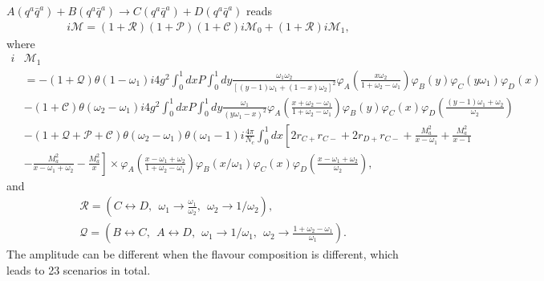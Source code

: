 \documentclass[8pt]{beamer}
\begin{document}
\begin{frame}
	$A(q^a \bar
		q^a)+B(q^a\bar q^a)\rightarrow C(q^a\bar q^a)+D(q^a\bar q^a) $ reads
	\begin{eqnarray}
		i\mathcal{M}
		=(1+\mathcal{R})(1+\mathcal{P})(1+\mathcal{C})i\mathcal{M}_{0}+(1+\mathcal{R})i\mathcal{M}_{1},
	\end{eqnarray}
	where
	\small
	\begin{align*}
		i & \mathcal{M}_{1}                                                    \\
		  & =-(1+\mathcal{Q})\theta(1-\omega_1)i4g^2\int_0^1
		dx P\int_0^1
		dy\frac{\omega_1\omega_2}{[(y-1)\omega_1+(1-x)\omega_2]^2}\varphi_A(\frac{x\omega_2}{1+\omega_2-\omega_1})\varphi_B(y)
		\varphi_C(y\omega_1)\varphi_D(x)\nonumber\\
		  & -(1+\mathcal{C})\theta(\omega_2-\omega_1)i4g^2\int_0^1dx P\int_0^1
		dy\frac{\omega_1}{(y\omega_1-x)^2}\varphi_A(\frac{x+\omega_2-\omega_1}{1+\omega_2-\omega_1})\varphi_B(y)
		\varphi_C(x)\varphi_D(\frac{(y-1)\omega_1+\omega_2}{\omega_2})\nonumber\\
		  &
		-(1+\mathcal{Q}+\mathcal{P}+\mathcal{C})\theta(\omega_2-\omega_1)\theta(\omega_1-1)i\frac{4\pi}{N_c}\int_0^1
		dx\left[2r_{C+}r_{C-}+2r_{D+}r_{C-}+\frac{M_a^2}{x-\omega_1}+\frac{M_a^2}{x-1}\right.\nonumber\\
		  & \left.-\frac{M_a^2}{x-\omega_1+\omega_2} -\frac{M_a^2}{x}\right]
		\times\varphi_A(\frac{x-\omega_1+\omega_2}{1+\omega_2-\omega_1})\varphi_B(x/\omega_1)
		\varphi_C(x)\varphi_D(\frac{x-\omega_1+\omega_2}{\omega_2}),\nonumber
	\end{align*}
	\normalsize
	and
	\begin{align}
		  & \mathcal{R}=(C\leftrightarrow D,\ \ \omega_1\rightarrow
		\frac{\omega_1}{\omega_2},\ \ \omega_2\rightarrow 1/\omega_2),\ \ \ \nonumber\\
		  & \mathcal{Q}=(B\leftrightarrow C,\ \ A\leftrightarrow D,\ \
		\omega_1\rightarrow 1/\omega_1,\ \ \omega_2\rightarrow
		\frac{1+\omega_2-\omega_1}{\omega_1}).
	\end{align}
	The amplitude can be different when the flavour composition is different, which leads to 23 scenarios in total.
\end{frame}
\end{document}
